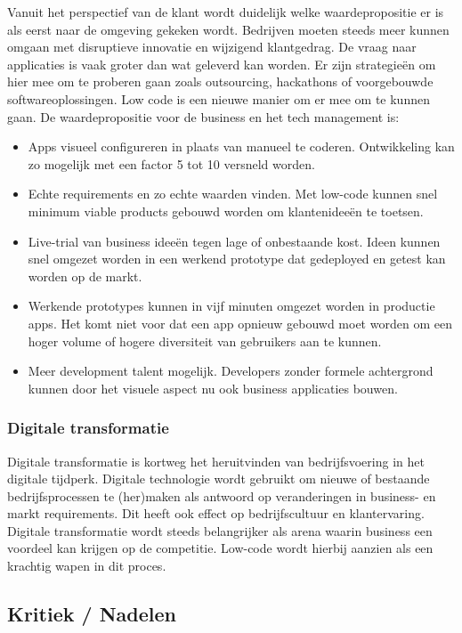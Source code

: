Vanuit het perspectief van de klant wordt duidelijk welke waardepropositie er is als eerst naar de omgeving gekeken wordt. Bedrijven moeten steeds meer kunnen omgaan met disruptieve innovatie en wijzigend klantgedrag. De vraag naar applicaties is vaak groter dan wat geleverd kan worden. Er zijn strategieën om hier mee om te proberen gaan zoals outsourcing, hackathons of voorgebouwde softwareoplossingen. Low code is een nieuwe manier om er mee om te kunnen gaan. De waardepropositie voor de business en het tech management is:
\begin{itemize}
    \item Apps visueel configureren in plaats van manueel te coderen. Ontwikkeling kan zo mogelijk met een factor 5 tot 10 versneld worden.
    \item Echte requirements en zo echte waarden vinden. Met low-code kunnen snel minimum viable products gebouwd worden om klantenideeën te toetsen.
    \item Live-trial van business ideeën tegen lage of onbestaande kost. Ideen kunnen snel omgezet worden in een werkend prototype dat gedeployed en getest kan worden op de markt.
    \item Werkende prototypes kunnen in vijf minuten omgezet worden in productie apps. Het komt niet voor dat een app opnieuw gebouwd moet worden om een hoger volume of hogere diversiteit van gebruikers aan te kunnen.
    \item Meer development talent mogelijk. Developers zonder formele achtergrond kunnen door het visuele aspect nu ook business applicaties bouwen.
\end{itemize} \autocite{Richardson2016}

\subsubsection{Digitale transformatie}

Digitale transformatie is kortweg het heruitvinden van bedrijfsvoering in het digitale tijdperk. Digitale technologie wordt gebruikt om nieuwe of bestaande bedrijfsprocessen te (her)maken als antwoord op veranderingen in business- en markt requirements. Dit heeft ook effect op bedrijfscultuur en klantervaring. \autocite{Salesforce}\\
Digitale transformatie wordt steeds belangrijker als arena waarin business een voordeel kan krijgen op de competitie. Low-code wordt hierbij aanzien als een krachtig wapen in dit proces.

\subsection{Kritiek / Nadelen}

